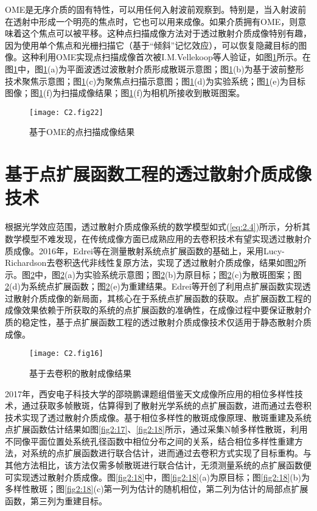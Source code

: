 OME是无序介质的固有特性，可以用任何入射波前观察到。特别是，当入射波前在透射中形成一个明亮的焦点时，它也可以用来成像。如果介质拥有OME，则意味着这个焦点可以被平移。这种点扫描成像方法对于透过散射介质成像特别有趣，因为使用单个焦点和光栅扫描它（基于“倾斜”记忆效应），可以恢复隐藏目标的图像。这种利用OME实现点扫描成像首次被I.M.Vellekoop等人验证\cite{vellekoop_scattered_2010}，如图\ref{fig2:22}所示\cite{vellekoop_scattered_2010}。在图\ref{fig2:22}中，图\ref{fig2:22}(a)为平面波透过波散射介质形成散斑示意图；图\ref{fig2:22}(b)为基于波前整形技术聚焦示意图；图\ref{fig2:22}(c)为聚焦点扫描示意图；图\ref{fig2:22}(d)为实验系统；图\ref{fig2:22}(e)为目标图像；图\ref{fig2:22}(f)为扫描成像结果；图\ref{fig2:22}(f)为相机所接收到散斑图案。

\begin{figure}[htp]
	\centering
	\texttt{[image: C2.fig22]}
	\caption{基于OME的点扫描成像结果}
	\label{fig2:22}
\end{figure}

\section{基于点扩展函数工程的透过散射介质成像技术}

根据光学效应范围，透过散射介质成像系统的数学模型如式(\ref{eq:2.4})所示，分析其数学模型不难发现，在传统成像方面已成熟应用的去卷积技术有望实现透过散射介质成像。2016年，Edrei等\cite{edrei_memory-effect_2016}在测量散射系统点扩展函数的基础上，采用Lucy-Richardson去卷积迭代非线性复原方法\cite{richardson_bayesian-based_1972,1974AJ_79_745L}，实现了透过散射介质成像，结果如图\ref{fig2:16}所示\cite{edrei_memory-effect_2016}。图\ref{fig2:16}中，图\ref{fig2:16}(a)为实验系统示意图；图\ref{fig2:16}(b)为原目标；图\ref{fig2:16}(c)为散斑图案；图\ref{fig2:16}(d)为系统点扩展函数；图\ref{fig2:16}(e)为重建结果。Edrei等开创了利用点扩展函数实现透过散射介质成像的新局面，其核心在于系统点扩展函数的获取。点扩展函数工程的成像效果依赖于所获取的系统的点扩展函数的准确性，在成像过程中要保证散射介质的稳定性，基于点扩展函数工程的透过散射介质成像技术仅适用于静态散射介质成像。

\begin{figure}[htp]
	\centering
	\texttt{[image: C2.fig16]}
	\caption{基于去卷积的散射成像结果}
	\label{fig2:16}
\end{figure}

2017年，西安电子科技大学的邵晓鹏课题组\cite{wu_imaging_2017}借鉴天文成像所应用的相位多样性技术，通过获取多帧散斑，估算得到了散射光学系统的点扩展函数，进而通过去卷积技术实现了透过散射介质成像。基于相位多样性的散斑成像原理、散斑重建及系统点扩展函数估计结果如图\ref{fig2:17}、\ref{fig2:18}所示\cite{wu_imaging_2017}，通过采集N帧多样性散斑，利用不同像平面位置处系统孔径函数中相位分布之间的关系，结合相位多样性重建方法，对系统的点扩展函数进行联合估计，进而通过去卷积方式实现了目标重构。与其他方法相比，该方法仅需多帧散斑进行联合估计，无须测量系统的点扩展函数便可实现透过散射介质成像。图\ref{fig2:18}中，图\ref{fig2:18}(a)为原目标；图\ref{fig2:18}(b)为多样性散斑；图\ref{fig2:18}(c)第一列为估计的随机相位，第二列为估计的局部点扩展函数，第三列为重建目标。

